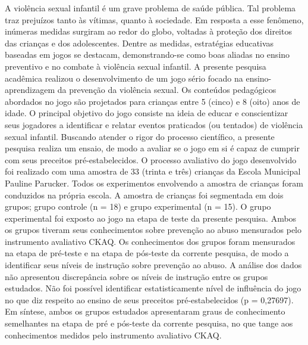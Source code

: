 
\setlength{\absparsep}{8pt} %
\begin{resumo}
  A violência sexual infantil é um grave problema de saúde pública. Tal problema traz prejuízos tanto às vítimas, quanto à sociedade. Em resposta a esse fenômeno, inúmeras medidas surgiram ao redor do globo, voltadas à proteção dos direitos das crianças e dos adolescentes. Dentre as medidas, estratégias educativas baseadas em jogos se destacam, demonstrando-se como boas aliadas no ensino preventivo e no combate à violência sexual infantil. 
  A presente pesquisa acadêmica realizou o desenvolvimento de um jogo sério focado na ensino-aprendizagem da prevenção da violência sexual. Os conteúdos pedagógicos abordados no jogo são projetados para crianças entre 5 (cinco) e 8 (oito) anos de idade. O principal objetivo do jogo consiste na ideia de educar e conscientizar seus jogadores a identificar e relatar eventos praticados (ou tentados) de violência sexual infantil. Buscando atender o rigor do processo científico, a presente pesquisa realiza um ensaio, de modo a avaliar se o jogo em si é capaz de cumprir com seus preceitos pré-estabelecidos. 
  O processo avaliativo do jogo desenvolvido foi realizado com uma amostra de 33 (trinta e três) crianças da Escola Municipal Pauline Parucker. Todos os experimentos envolvendo a amostra de crianças foram conduzidos na própria escola. %
  A amostra de crianças foi segmentada em dois grupos; grupo controle (n = 18) e grupo experimental (n = 15). O grupo experimental foi exposto ao jogo na etapa de teste da presente pesquisa. Ambos os grupos tiveram seus conhecimentos sobre prevenção ao abuso mensurados pelo instrumento avaliativo \ac{CKAQ}. Os conhecimentos dos grupos foram mensurados na etapa de pré-teste e na etapa de pós-teste da corrente pesquisa, de modo a identificar seus níveis de instrução sobre prevenção ao abuso. 
  A análise dos dados não apresentou discrepância sobre os níveis de instrução entre os grupos estudados. Não foi possível identificar estatisticamente nível de influência do jogo no que diz respeito ao ensino de seus preceitos pré-estabelecidos (p = 0,27697). Em síntese, ambos os grupos estudados apresentaram graus de conhecimento semelhantes na etapa de pré e pós-teste da corrente pesquisa, no que tange aos conhecimentos medidos pelo instrumento avaliativo \ac{CKAQ}.

\end{resumo}
